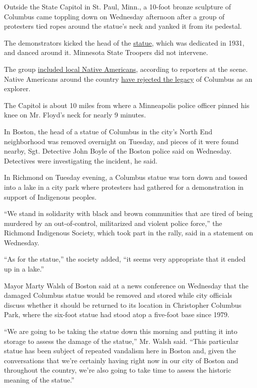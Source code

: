 Outside the State Capitol in St. Paul, Minn., a 10-foot bronze sculpture
of Columbus came toppling down on Wednesday afternoon after a group of
protesters tied ropes around the statue's neck and yanked it from its
pedestal.

The demonstrators kicked the head of the
\href{https://www.nytimes3xbfgragh.onion/2020/06/15/arts/design/fallen-statues-what-next.html}{statue},
which was dedicated in 1931, and danced around it. Minnesota State
Troopers did not intervene.

The group
\href{https://twitter.com/maxnesterak/status/1270839254462201867}{included
local Native Americans}, according to reporters at the scene. Native
Americans around the country
\href{https://www.history.com/news/columbus-day-controversy}{have
rejected the legacy} of Columbus as an explorer.

The Capitol is about 10 miles from where a Minneapolis police officer
pinned his knee on Mr. Floyd's neck for nearly 9 minutes.

In Boston, the head of a statue of Columbus in the city's North End
neighborhood was removed overnight on Tuesday, and pieces of it were
found nearby, Sgt. Detective John Boyle of the Boston police said on
Wednesday. Detectives were investigating the incident, he said.

In Richmond on Tuesday evening, a Columbus statue was torn down and
tossed into a lake in a city park where protesters had gathered for a
demonstration in support of Indigenous peoples.

``We stand in solidarity with black and brown communities that are tired
of being murdered by an out-of-control, militarized and violent police
force,'' the Richmond Indigenous Society, which took part in the rally,
said in a statement on Wednesday.

``As for the statue,'' the society added, ``it seems very appropriate
that it ended up in a lake.''

Mayor Marty Walsh of Boston said at a news conference on Wednesday that
the damaged Columbus statue would be removed and stored while city
officials discuss whether it should be returned to its location in
Christopher Columbus Park, where the six-foot statue had stood atop a
five-foot base since 1979.

``We are going to be taking the statue down this morning and putting it
into storage to assess the damage of the statue,'' Mr. Walsh said.
``This particular statue has been subject of repeated vandalism here in
Boston and, given the conversations that we're certainly having right
now in our city of Boston and throughout the country, we're also going
to take time to assess the historic meaning of the statue.''

